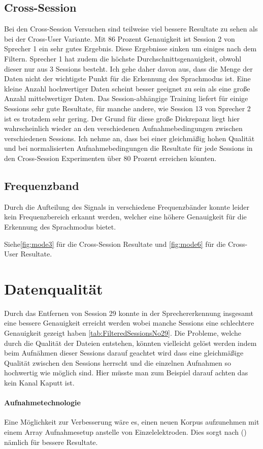 \subsection{Cross-Session}
Bei den Cross-Session Versuchen sind teilweise viel bessere Resultate zu sehen als bei der Cross-User Variante. Mit 86 Prozent Genauigkeit ist Session 2 von Sprecher 1 ein sehr gutes Ergebnis. Diese Ergebnisse sinken um einiges nach dem Filtern. Sprecher 1 hat zudem die höchste Durchschnittsgenauigkeit, obwohl dieser nur aus 3 Sessions besteht. Ich gehe daher davon aus, dass die Menge der Daten nicht der wichtigste Punkt für die Erkennung des Sprachmodus ist. Eine kleine Anzahl hochwertiger Daten scheint besser geeignet zu sein als eine große Anzahl mittelwertiger Daten. Das Session-abhängige Training liefert für einige Sessions sehr gute Resultate, für manche andere, wie Session 13 von Sprecher 2 ist es trotzdem sehr gering. Der Grund für diese große Diskrepanz liegt hier wahrscheinlich wieder an den verschiedenen Aufnahmebedingungen zwischen verschiedenen Sessions. Ich nehme an, dass bei einer gleichmäßig hohen Qualität und bei normalisierten Aufnahmebedingungen die Resultate für jede Sessions in den Cross-Session Experimenten über 80 Prozent erreichen könnten.

\subsection{Frequenzband}
Durch die Aufteilung des Signals in verschiedene Frequenzbänder konnte leider kein Frequenzbereich erkannt werden, welcher eine höhere Genauigkeit für die Erkennung des Sprachmodus bietet. 

Siehe\ref{fig:mode3} für die Cross-Session Resultate und \ref{fig:mode6} für die Cross-User Resultate.

\section{Datenqualität}
Durch das Entfernen von Session 29 konnte in der Sprechererkennung insgesamt eine bessere Genauigkeit erreicht werden wobei manche Sessions eine schlechtere Genauigkeit gezeigt haben \ref{tab:FilteredSessionsNo29}. 
Die Probleme, welche durch die Qualität der Dateien entstehen, könnten vielleicht gelöst werden indem beim Aufnähmen dieser Sessions darauf geachtet wird dass eine gleichmäßige Qualität zwischen den Sessions herrscht und die einzelnen Aufnahmen so hochwertig wie möglich sind. Hier müsste man zum Beispiel darauf achten das kein Kanal Kaputt ist.

\paragraph{Aufnahmetechnologie}
Eine Möglichkeit zur Verbesserung wäre es, einen neuen Korpus aufzunehmen mit einem Array Aufnahmesetup anstelle von Einzelelektroden. Dies sorgt nach (\cite{diener2020cslemgarray}) nämlich für bessere Resultate. 